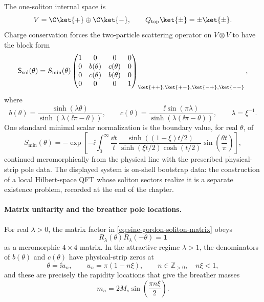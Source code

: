 The one-soliton internal space is
\[
  V=\C\ket{+}\oplus\C\ket{-},
  \qquad
  Q_{\mathrm{top}}\ket{\pm}=\pm\ket{\pm}.
\]
Charge conservation forces the two-particle scattering operator on
\(V\otimes V\) to have the block form
\begin{equation}
  \mathsf S_{\mathrm{sol}}(\theta)
  =
  S_{\mathrm{min}}(\theta)
  \begin{pmatrix}
    1&0&0&0\\
    0&b(\theta)&c(\theta)&0\\
    0&c(\theta)&b(\theta)&0\\
    0&0&0&1
  \end{pmatrix}_{\ket{++},\ket{+-},\ket{-+},\ket{--}},
  \label{eq:sine-gordon-soliton-matrix}
\end{equation}
where
\[
  b(\theta)
  =
  \frac{\sinh(\lambda\theta)}
       {\sinh(\lambda(\ii\pi-\theta))},
  \qquad
  c(\theta)
  =
  \frac{\ii\sin(\pi\lambda)}
       {\sinh(\lambda(\ii\pi-\theta))},
  \qquad
  \lambda=\xi^{-1}.
\]
One standard minimal scalar normalization is the boundary value, for real
\(\theta\), of
\begin{equation}
  S_{\mathrm{min}}(\theta)
  =
  -\exp\left[
    -\ii\int_0^\infty\frac{\dd t}{t}\,
    \frac{\sinh\!\left((1-\xi)t/2\right)}
         {\sinh(\xi t/2)\cosh(t/2)}
    \sin\!\left(\frac{\theta t}{\pi}\right)
  \right],
  \label{eq:sine-gordon-minimal-scalar-factor}
\end{equation}
continued meromorphically from the physical line with the prescribed
physical-strip pole data.  The displayed system is on-shell bootstrap
data: the construction of a local Hilbert-space QFT whose soliton sectors
realize it is a separate existence problem, recorded at the end of the
chapter.

\paragraph{Matrix unitarity and the breather pole locations.}
For real \(\lambda>0\), the matrix factor in
\eqref{eq:sine-gordon-soliton-matrix} obeys
\[
  R_\lambda(\theta)R_\lambda(-\theta)=\mathbf 1
\]
as a meromorphic \(4\times4\) matrix.  In the attractive regime
\(\lambda>1\), the denominators of \(b(\theta)\) and \(c(\theta)\) have
physical-strip zeros at
\begin{equation}
  \theta=\ii u_n,\qquad
  u_n=\pi(1-n\xi),
  \qquad n\in\mathbb Z_{>0},\quad n\xi<1,
  \label{eq:sine-gordon-breather-pole-locations}
\end{equation}
and these are precisely the rapidity locations that give the breather masses
\[
  m_n=2M_s\sin\!\left(\frac{\pi n\xi}{2}\right).
\]

